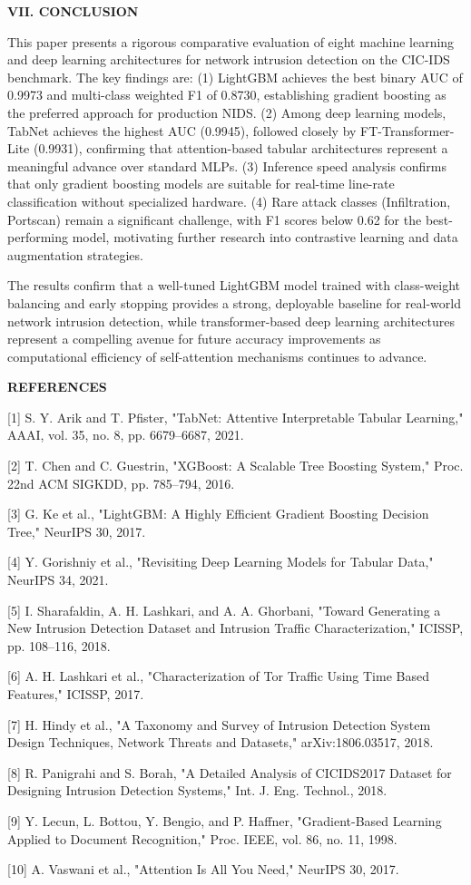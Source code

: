 \documentclass[
  journal,
  10pt]{IEEEtran}
\begin{document}
\textbf{VII. CONCLUSION}

This paper presents a rigorous comparative evaluation of eight machine
learning and deep learning architectures for network intrusion detection
on the CIC-IDS benchmark. The key findings are: (1) LightGBM achieves
the best binary AUC of 0.9973 and multi-class weighted F1 of 0.8730,
establishing gradient boosting as the preferred approach for production
NIDS. (2) Among deep learning models, TabNet achieves the highest AUC
(0.9945), followed closely by FT-Transformer-Lite (0.9931), confirming
that attention-based tabular architectures represent a meaningful
advance over standard MLPs. (3) Inference speed analysis confirms that
only gradient boosting models are suitable for real-time line-rate
classification without specialized hardware. (4) Rare attack classes
(Infiltration, Portscan) remain a significant challenge, with F1 scores
below 0.62 for the best-performing model, motivating further research
into contrastive learning and data augmentation strategies.

The results confirm that a well-tuned LightGBM model trained with
class-weight balancing and early stopping provides a strong, deployable
baseline for real-world network intrusion detection, while
transformer-based deep learning architectures represent a compelling
avenue for future accuracy improvements as computational efficiency of
self-attention mechanisms continues to advance.

\textbf{REFERENCES}

{[}1{]} S. Y. Arik and T. Pfister, "TabNet: Attentive Interpretable
Tabular Learning," AAAI, vol. 35, no. 8, pp. 6679--6687, 2021.

{[}2{]} T. Chen and C. Guestrin, "XGBoost: A Scalable Tree Boosting
System," Proc. 22nd ACM SIGKDD, pp. 785--794, 2016.

{[}3{]} G. Ke et al., "LightGBM: A Highly Efficient Gradient Boosting
Decision Tree," NeurIPS 30, 2017.

{[}4{]} Y. Gorishniy et al., "Revisiting Deep Learning Models for
Tabular Data," NeurIPS 34, 2021.

{[}5{]} I. Sharafaldin, A. H. Lashkari, and A. A. Ghorbani, "Toward
Generating a New Intrusion Detection Dataset and Intrusion Traffic
Characterization," ICISSP, pp. 108--116, 2018.

{[}6{]} A. H. Lashkari et al., "Characterization of Tor Traffic Using
Time Based Features," ICISSP, 2017.

{[}7{]} H. Hindy et al., "A Taxonomy and Survey of Intrusion Detection
System Design Techniques, Network Threats and Datasets,"
arXiv:1806.03517, 2018.

{[}8{]} R. Panigrahi and S. Borah, "A Detailed Analysis of CICIDS2017
Dataset for Designing Intrusion Detection Systems," Int. J. Eng.
Technol., 2018.

{[}9{]} Y. Lecun, L. Bottou, Y. Bengio, and P. Haffner, "Gradient-Based
Learning Applied to Document Recognition," Proc. IEEE, vol. 86, no. 11,
1998.

{[}10{]} A. Vaswani et al., "Attention Is All You Need," NeurIPS 30,
2017.
\end{document}
